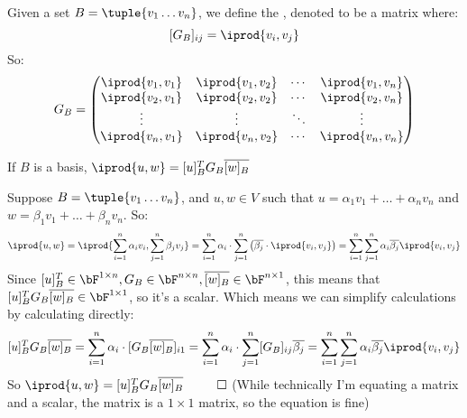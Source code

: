 \documentclass[10pt]{article}
\begin{document}
\begin{definition*}

Given a set $B=\tuple{v_1\dots v_n}$, we define the , denoted  to be a matrix where:
\[ [G_B]_{ij} = \iprod{v_i,v_j} \]
So:
\[ G_B = \begin{pmatrix} 
\iprod{v_1,v_1} & \iprod{v_1,v_2} & \cdots & \iprod{v_1,v_n} \\ 
\iprod{v_2,v_1} & \iprod{v_2,v_2} & \cdots & \iprod{v_2,v_n} \\
\vdots & \vdots & \ddots & \vdots \\
\iprod{v_n,v_1} & \iprod{v_n,v_2} & \cdots & \iprod{v_n,v_n} \\
\end{pmatrix} \]

\end{definition*}

\begin{statement}{If $B$ is a basis, $\iprod{u,w}=[u]_B^TG_B\overline{[w]_B}$}

Suppose $B=\tuple{v_1\dots v_n}$, and $u,w\in V$ such that $u=\alpha_1 v_1+\dots+\alpha_n v_n$ and $w=\beta_1 v_1+\dots+\beta_n v_n$. So:
\[ \iprod{u,w} = \iprod{\sum_{i=1}^n \alpha_i v_i, \sum_{j=1}^n \beta_j v_j} = \sum_{i=1}^n\alpha_i\cdot\sum_{j=1}^n\left(\overline{\beta_j}\cdot\iprod{v_i,v_j}\right) = \sum_{i=1}^n\sum_{j=1}^n\alpha_i\overline{\beta_j}\iprod{v_i,v_j} \]
Since $[u]_B^T\in\bF^{1\times n}, G_B\in\bF^{n\times n}, \overline{[w]_B}\in\bF^{n\times 1}$, this means that $[u]_B^TG_B\overline{[w]_B}\in\bF^{1\times1}$, so it's a scalar. Which means we can simplify calculations by calculating directly:
\[ [u]_B^TG_B\overline{[w]_B} = \sum_{i=1}^n\alpha_i\cdot[G_B\overline{[w]_B}]_{i1} = \sum_{i=1}^n\alpha_i\cdot\sum_{j=1}^n[G_B]_{ij}\overline{\beta_j} = \sum_{i=1}^n\sum_{j=1}^n\alpha_i\overline{\beta_j}\iprod{v_i,v_j} \]
So $\iprod{u,w}=[u]_B^TG_B\overline{[w]_B} ~~ \qed$ (While technically I'm equating a matrix and a scalar, the matrix is a $1\times1$ matrix, so the equation is fine)

\end{statement}
\end{document}
